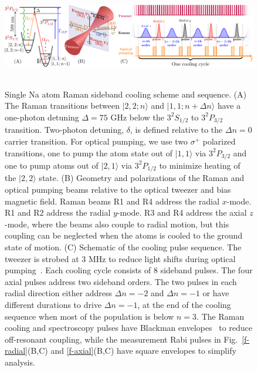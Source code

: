 \documentclass[aps,prl,twocolumn,groupedaddress]{revtex4-1}
\begin{document}
\begin{figure}
  \includegraphics[height=4.5cm]{fig1_combined.pdf}
  \caption{Single Na atom Raman sideband cooling scheme and sequence. (A)
    The Raman transitions between $|2,2;n\rangle$ and $|1,1;n+\Delta n\rangle$ have a one-photon detuning $\Delta=75$ GHz below the $3^2S_{1/2}$ to $3^2P_{3/2}$ transition. Two-photon detuning, $\delta$, is defined relative to the $\Delta n=0$ carrier transition. For optical pumping, we use two $\sigma^+$ polarized transitions, one to pump the atom state out of $|1,1\rangle$ via $3^2P_{3/2}$ and one to pump atoms out of $|2,1\rangle$ via $3^2P_{1/2}$
     to minimize heating of the $|2,2\rangle$ state.
    (B) Geometry and polarizations of the Raman and optical pumping beams relative to the
    optical tweezer and bias magnetic field.  Raman beams R1 and R4 address the radial $x$-mode. R1 and R2 address the radial $y$-mode.  R3 and R4 address the axial $z$-mode, where the beams also couple to radial motion, but this coupling can be neglected when the atoms is cooled to the ground state of motion.
    (C) Schematic of the cooling pulse sequence. The tweezer is strobed at 3 MHz to
    reduce light shifts during optical pumping~\cite{Hutzler2017-LightShifts}.
    Each cooling cycle consists of $8$ sideband pulses.
    The four axial pulses address two sideband orders.
    The two pulses in each radial direction either address $\Delta n=-2$ and $\Delta n=-1$
    or have different durations to drive $\Delta n=-1$, at the end of the cooling sequence when most of the population is below $n=3$.
    The Raman cooling and spectroscopy pulses have Blackman envelopes~\cite{Kasevich1992}
    to reduce off-resonant coupling,
    while the measurement Rabi pulses in Fig.~\ref{f-radial}(B,C) and \ref{f-axial}(B,C)
    have square envelopes to simplify analysis.
    \label{f-setup}}
\end{figure}
\end{document}
